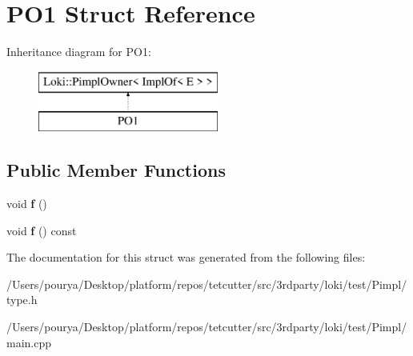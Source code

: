 \hypertarget{structPO1}{}\section{P\+O1 Struct Reference}
\label{structPO1}
Inheritance diagram for P\+O1\+:\begin{figure}[H]
\begin{center}
\leavevmode
\includegraphics[height=2.000000cm]{structPO1}
\end{center}
\end{figure}
\subsection*{Public Member Functions}
\begin{DoxyCompactItemize}
\item 
\hypertarget{structPO1_a15773c08d1c27022ec4cdeb570f4bc45}{}void {\bfseries f} ()\label{structPO1_a15773c08d1c27022ec4cdeb570f4bc45}

\item 
\hypertarget{structPO1_a7ca3a6b6399a1cd19b7683c6e468d493}{}void {\bfseries f} () const \label{structPO1_a7ca3a6b6399a1cd19b7683c6e468d493}

\end{DoxyCompactItemize}


The documentation for this struct was generated from the following files\+:\begin{DoxyCompactItemize}
\item 
/\+Users/pourya/\+Desktop/platform/repos/tetcutter/src/3rdparty/loki/test/\+Pimpl/type.\+h\item 
/\+Users/pourya/\+Desktop/platform/repos/tetcutter/src/3rdparty/loki/test/\+Pimpl/main.\+cpp\end{DoxyCompactItemize}
